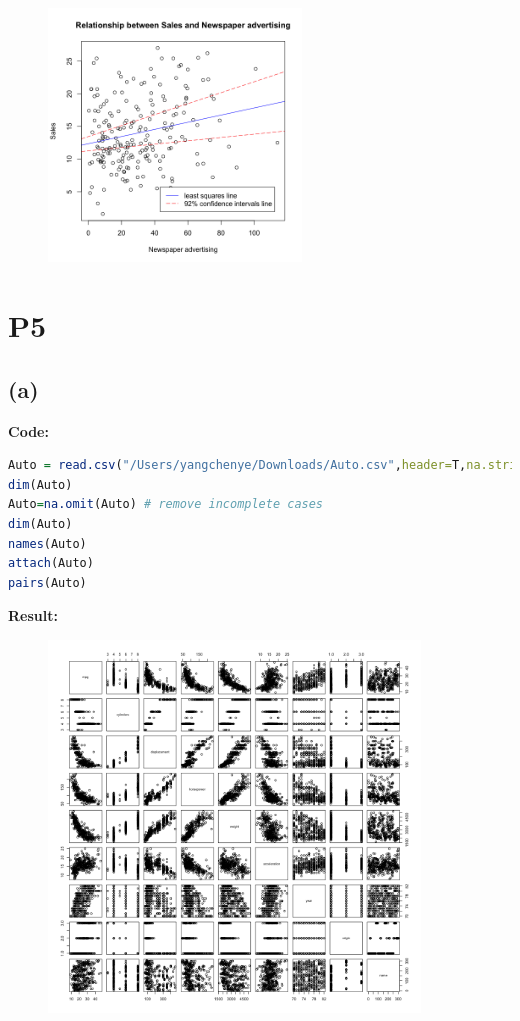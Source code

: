 \documentclass[twoside]{homework}
\begin{document}
\newpage
\begin{figure}[!h]
\begin{center}
\includegraphics[width=0.6\textwidth]{HW1_P4_3.png}
\end{center}
\label{fig:HW1_P4_3}
\end{figure}


\newpage

\section*{P5}
\subsection*{(a)}
\textbf{Code:}
\begin{lstlisting}[language=R]
Auto = read.csv("/Users/yangchenye/Downloads/Auto.csv",header=T,na.strings="?") 
dim(Auto)
Auto=na.omit(Auto) # remove incomplete cases
dim(Auto)
names(Auto)
attach(Auto)
pairs(Auto)
\end{lstlisting}
\textbf{Result:}
\begin{figure}[!h]
\begin{center}
\includegraphics[width=0.88\textwidth]{HW1_P5_a.png}
\end{center}
\label{fig:HW1_P5_a}
\end{figure}
\end{document}
